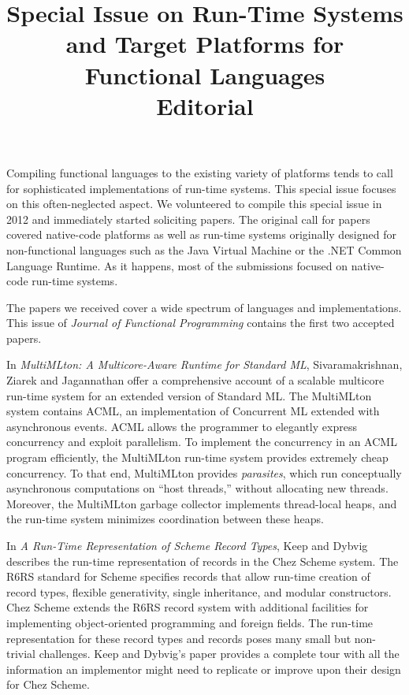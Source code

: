 \documentclass{jfp1}
\title[Special Issue on Run-Time Systems and Target Platforms for Functional Languages]
      {Special Issue on Run-Time Systems and Target Platforms for Functional Languages \\
Editorial}
\begin{document}
\maketitle

\noindent Compiling functional languages to the existing variety of platforms tends to call 
for sophisticated implementations of run-time systems. This special issue focuses 
on this often-neglected aspect.  
We volunteered to compile this special issue in 2012 and immediately
started soliciting papers.  The
original call for papers covered native-code platforms as well as
run-time systems originally designed for non-functional languages
such as the Java Virtual Machine or the .NET Common Language Runtime.
As it happens, most of the submissions focused on 
native-code run-time systems.  

The papers we received
cover a wide spectrum of languages and implementations.  This issue of
\textit{Journal of Functional Programming} contains the first two
accepted papers.

In \textit{MultiMLton: A Multicore-Aware Runtime for Standard ML},
Sivaramakrishnan, Ziarek and Jagannathan offer a comprehensive account
of a scalable multicore run-time system for an extended version of
Standard ML.  The MultiMLton system contains ACML, an implementation of
Concurrent ML extended with asynchronous events.  ACML allows the
programmer to elegantly express concurrency and exploit parallelism.
To implement the concurrency in an ACML program 
efficiently, the MultiMLton run-time system provides
extremely cheap concurrency.  To that end, MultiMLton provides
\textit{parasites}, which run conceptually asynchronous computations
on ``host threads,'' without allocating new threads.  Moreover, the
MultiMLton garbage collector implements thread-local heaps, and the
run-time system minimizes coordination between these heaps.

In \textit{A Run-Time Representation of Scheme Record Types}, Keep and
Dybvig describes the run-time representation
of records in the Chez Scheme system.  
The R6RS standard for Scheme specifies records that allow run-time creation of
record types, flexible generativity, single inheritance, and modular
constructors. Chez Scheme extends the R6RS record
system with additional facilities for implementing object-oriented programming
and foreign fields.  The run-time representation for these record types and
records poses many small but non-trivial challenges. Keep and Dybvig's paper
provides a complete tour with all the information an implementor might
need to replicate or improve upon their design for Chez Scheme.
\end{document}
